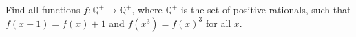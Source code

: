 Find all functions $f : \mathbb{Q}^{+} \rightarrow \mathbb{Q}^{+}$, where $\mathbb{Q}^{+}$ is the set of positive rationals, such that $f(x+1) = f(x) + 1$ and $f(x^3) = f(x)^3$ for all $x$.